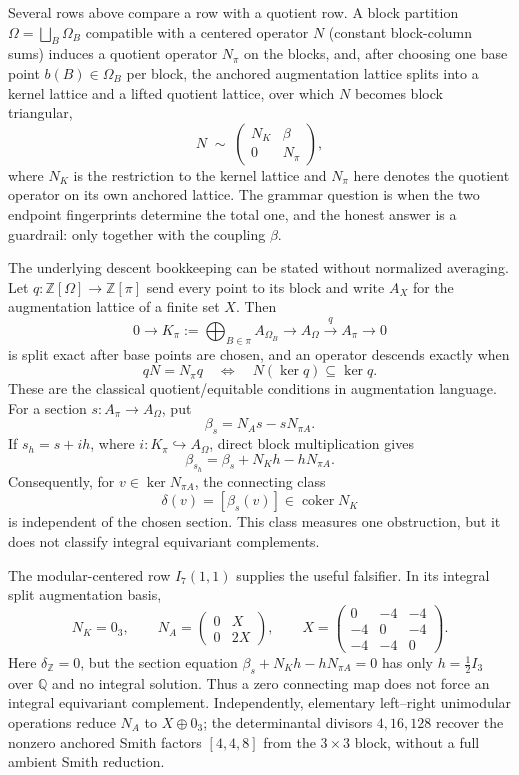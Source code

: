 Several rows above compare a row with a quotient row.  A block partition \(\Omega=\bigsqcup_B\Omega_B\) compatible with a centered operator \(N\) (constant block-column sums) induces a quotient operator \(N_\pi\) on the blocks, and, after choosing one base point \(b(B)\in\Omega_B\) per block, the anchored augmentation lattice splits into a kernel lattice and a lifted quotient lattice, over which \(N\) becomes block triangular,
\[
  N\;\sim\;\begin{pmatrix} N_K & \beta \\ 0 & N_\pi \end{pmatrix},
\]
where \(N_K\) is the restriction to the kernel lattice and \(N_\pi\) here denotes the quotient operator on its own anchored lattice.  The grammar question is when the two endpoint fingerprints determine the total one, and the honest answer is a guardrail: only together with the coupling \(\beta\).

The underlying descent bookkeeping can be stated without normalized averaging.
Let \(q:\mathbb Z[\Omega]\to\mathbb Z[\pi]\) send every point to its
block and write \(A_X\) for the augmentation lattice of a finite set \(X\).
Then
\[
  0\longrightarrow K_\pi:=\bigoplus_{B\in\pi}A_{\Omega_B}
  \longrightarrow A_\Omega\xrightarrow{q}A_\pi\longrightarrow0
\]
is split exact after base points are chosen, and an operator descends exactly
when
\[
  qN=N_\pi q
  \quad\Longleftrightarrow\quad
  N(\ker q)\subseteq\ker q.
\]
These are the classical quotient/equitable conditions in augmentation
language.  For a section \(s:A_\pi\to A_\Omega\), put
\[
  \beta_s=N_As-sN_{\pi A}.
\]
If \(s_h=s+i h\), where \(i:K_\pi\hookrightarrow A_\Omega\), direct block
multiplication gives
\[
  \beta_{s_h}=\beta_s+N_Kh-hN_{\pi A}.
\]
Consequently, for \(v\in\ker N_{\pi A}\), the connecting class
\[
  \delta(v)=[\beta_s(v)]\in\operatorname{coker}N_K
\]
is independent of the chosen section.  This class measures one obstruction,
but it does not classify integral equivariant complements.

The modular-centered row \(I_7(1,1)\) supplies the useful falsifier.  In its
integral split augmentation basis,
\[
  N_K=0_3,
  \qquad
  N_A=\begin{pmatrix}0&X\\0&2X\end{pmatrix},
  \qquad
  X=\begin{pmatrix}0&-4&-4\\-4&0&-4\\-4&-4&0\end{pmatrix}.
\]
Here \(\delta_{\mathbb Z}=0\), but the section equation
\(\beta_s+N_Kh-hN_{\pi A}=0\) has only \(h=\frac12I_3\) over
\(\mathbb Q\) and no integral solution.  Thus a zero connecting map does not
force an integral equivariant complement.  Independently, elementary
left--right unimodular operations reduce \(N_A\) to \(X\oplus0_3\); the
determinantal divisors \(4,16,128\) recover the nonzero anchored Smith factors
\([4,4,8]\) from the \(3\times3\) block, without a full ambient Smith
reduction.

